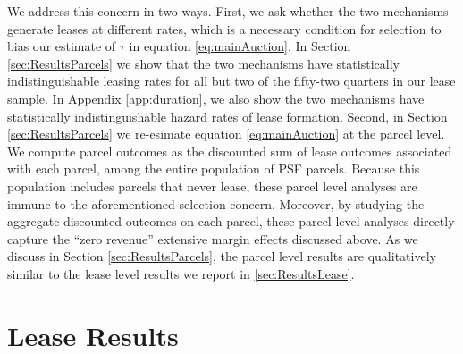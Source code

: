 We address this concern in two ways. First, we ask whether the two mechanisms generate leases at different rates, which is a necessary condition for selection to bias our estimate of $\tau$ in equation \ref{eq:mainAuction}. In Section \ref{sec:ResultsParcels} we show that the two mechanisms have statistically indistinguishable leasing rates for all but two of the fifty-two quarters in our lease sample. In Appendix \ref{app:duration}, we also show the two mechanisms have statistically indistinguishable hazard rates of lease formation. Second, in Section \ref{sec:ResultsParcels} we re-esimate equation \ref{eq:mainAuction} at the parcel level.  We compute parcel outcomes as the discounted sum of lease outcomes associated with each parcel, among the entire population of PSF parcels. Because this population includes parcels that never lease, these parcel level analyses are immune to the aforementioned selection concern.  Moreover, by studying the aggregate discounted outcomes on each parcel, these parcel level analyses directly capture the ``zero revenue'' extensive margin effects discussed above.  As we discuss in Section \ref{sec:ResultsParcels}, the parcel level results are qualitatively similar to the lease level results we report in \ref{sec:ResultsLease}. 

\section{Lease Results \label{sec:ResultsLease}}


